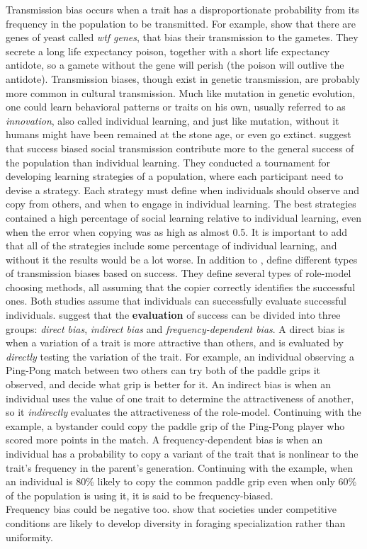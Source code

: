 \documentclass[11pt]{article}
\begin{document}
Transmission bias occurs when a trait has a disproportionate probability from its frequency in the population to be transmitted.
For example, \citet{wtfGene} show that there are genes of yeast called \textit{wtf genes}, that bias their transmission to the gametes.
They secrete a long life expectancy poison, together with a short life expectancy antidote, so a gamete without the gene will perish (the poison will outlive the antidote).
Transmission biases, though exist in genetic transmission, are probably more common in cultural transmission.
Much like mutation in genetic evolution, one could learn behavioral patterns or traits on his own, usually referred to as \textit{innovation}, also called individual learning, and just like mutation, without it humans might have been remained at the stone age, or even go extinct.
\citet{strategiesPaper} suggest that success biased social transmission contribute more to the general success of the population than individual learning.
 They conducted a tournament for developing learning strategies of a population, where each participant need to devise a strategy.
 Each strategy must define when individuals should observe and copy from others, and when to engage in individual learning.
 The best strategies contained a high percentage of social learning relative to individual learning, even when the error when copying was as high as almost 0.5. It is important to add that all of the strategies include some percentage of individual learning, and without it the results would be a lot worse.
In addition to \citet{strategiesPaper}, \citet{complexityPaper} define different types of transmission biases based on success.
They define several types of role-model choosing methods, all assuming that the copier correctly identifies the successful ones.
Both studies assume that individuals can successfully evaluate successful individuals.
\citet[Ch. 5]{evolutionBook} suggest that the \textbf{evaluation} of success can be divided into three groups: \textit{direct bias}, \textit{indirect bias} and \textit{frequency-dependent bias}.
A direct bias is when a variation of a trait is more attractive than others, and is evaluated by \textit{directly} testing the variation of the trait.
For example, an individual observing a Ping-Pong match between two others can try both of the paddle grips it observed, and decide what grip is better for it.
An indirect bias is when an individual uses the value of one trait to determine the attractiveness of another, so it \textit{indirectly} evaluates the attractiveness of the role-model.
Continuing with the example, a bystander could copy the paddle grip of the Ping-Pong player who scored more points in the match.
A frequency-dependent bias is when an individual has a probability to copy a variant of the trait that is nonlinear to the trait's frequency in the parent's generation. 
Continuing with the example, when an individual is 80\% likely to copy the common paddle grip even when only 60\% of the population is using it, it is said to be frequency-biased.\\
Frequency bias could be negative too. \citet{negativeFrequency} show that societies under competitive conditions are likely to develop diversity in foraging specialization rather than uniformity.
 
\end{document}
